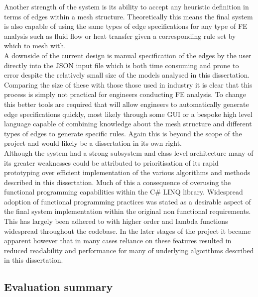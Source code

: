 \noindent
Another strength of the system is its ability to accept any heuristic definition in terms of edges within a mesh structure. Theoretically this means the final system is also capable of using the same types of edge specifications for any type of FE analysis such as fluid flow or heat transfer given a corresponding rule set by which to mesh with. \\


\noindent
A downside of the current design is manual specification of the edges by the user directly into the JSON input file which is both time consuming and prone to error despite the relatively small size of the models analysed in this dissertation. Comparing the size of these with those those used in industry it is clear that this process is simply not practical for engineers conducting FE analysis. To change this better tools are required that will allow engineers to automatically generate edge specifications quickly, most likely through some GUI or a bespoke high level language capable of combining knowledge about the mesh structure and different types of edges to generate specific rules. Again this is beyond the scope of the project and would likely be a dissertation in its own right. \\


\noindent
Although the system had a strong subsystem and class level architecture many of its greater weaknesses could be attributed to prioritisation of its rapid prototyping over efficient implementation of the various algorithms and methods described in this dissertation. Much of this a consequence of overusing the functional programming capabilities within the C\# LINQ library. Widespread adoption of functional programming practices was stated as a desirable aspect of the final system implementation within the original non functional requirements. This has largely been adhered to with  higher order and lambda functions widespread throughout the codebase. In the later stages of the project it became apparent however that in many cases reliance on these features resulted in reduced readability and performance for many of underlying algorithms described in this dissertation. \\




\subsection{Evaluation summary}
